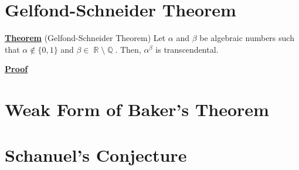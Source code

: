 \documentclass[a4paper, 11pt]{book}
\newcommand{\proof}{\underline{\textbf{Proof}} }
\newcommand{\theorem}{\underline{\textbf{Theorem}} }
\DeclareMathOperator{\Q}{\mathbb{Q}}
\DeclareMathOperator{\R}{\mathbb{R}}
\begin{document}
\chapter{Gelfond-Schneider Theorem}

\begin{mybox}
    \theorem{(Gelfond-Schneider Theorem) Let $\alpha$ and $\beta$ be algebraic numbers such that $\alpha \notin \{0, 1\}$ and $\beta \in \R \setminus \Q$. Then, ${\alpha}^{\beta}$ is transcendental.}\par
\end{mybox}
\proof{}
\chapter{Weak Form of Baker's Theorem}
\chapter{Schanuel's Conjecture}
\backmatter{}
\printindex
\end{document}
